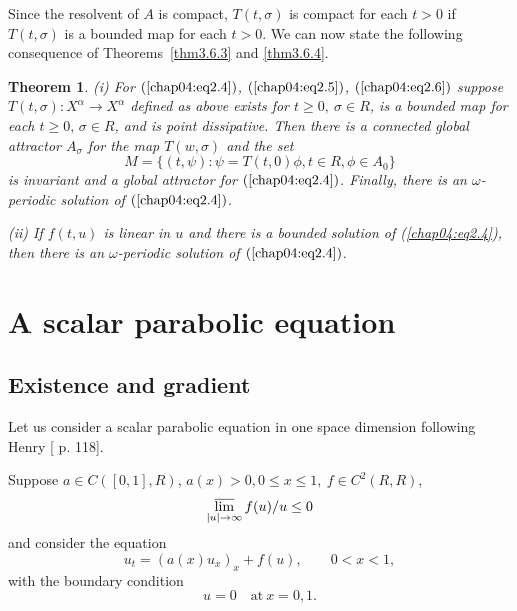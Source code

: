 \documentclass{surv-l}
\theoremstyle{plain}
\newtheorem{theorem}{Theorem}[section]
\theoremstyle{definition}
\numberwithin{equation}{section}
\numberwithin{figure}{chapter}
\begin{document}
Since the resolvent of $A$ is compact, $T(t, \sigma)$ is compact for each $t>0$ if $T(t, \sigma)$ is a bounded map for each $t>0$. We can now state the following consequence of Theorems~\ref{thm3.6.3} and \ref{thm3.6.4}.
\begin{theorem}\label{thm4.2.6}
\emph{(i)} For $(\ref{chap04:eq2.4})$, $(\ref{chap04:eq2.5})$, $(\ref{chap04:eq2.6})$ suppose $T(t, \sigma)\!:X^{\alpha}\rightarrow X^{\alpha}$ defined as above exists for $t\geq 0,\ \sigma\in R$, is a bounded map for each $t\geq 0,\,\sigma\in R$, and is point dissipative. Then there is a connected global attractor $A_{\sigma}$ for the map $T(w, \sigma)$ and the set
\begin{equation*}
M=\{(t, \psi)\!:\psi=T(t, 0)\phi, t\in R, \phi\in A_{0}\}
\end{equation*}
is invariant and a global attractor for $(\ref{chap04:eq2.4})$. Finally, there is an $\omega$-periodic solution of $(\ref{chap04:eq2.4})$.

\emph{(ii)} If $f(t, u)$ is linear in $u$ and there is a bounded solution of \emph{(\ref{chap04:eq2.4})}, then there is an $\omega$-periodic solution of $(\ref{chap04:eq2.4})$.
\end{theorem}

\section{A scalar parabolic equation}\label{sec4.3}

\subsection{Existence and gradient}\label{subsec4.3.1} Let us consider a scalar parabolic equation in one space dimension following Henry [\citeyear{1981henry} p. 118].

Suppose $a\in C([0, 1], R)$, $a(x)>0,0\leq x\leq 1,\ f\in C^{2}(R, R)$,
\begin{equation}\label{chap04:eq3.1}
\varlimsup_{|u|\rightarrow\infty}f(u)/u\leq 0
\end{equation}
and consider the equation
\begin{equation}\label{chap04:eq3.2}
u_{t}=(a(x)u_{x})_{x}+f(u),\qquad 0<x<1,
\end{equation}
with the boundary condition
\begin{equation}\label{chap04:eq3.3}
u=0\quad \mathrm{at}\ x=0,1.
\end{equation}
\end{document}
